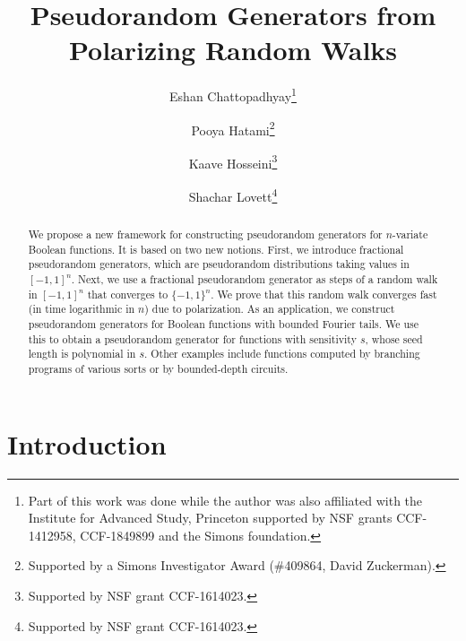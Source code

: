 \documentclass{toc}
\begin{document}
\begin{frontmatter}[classification=text]
  
%
%

%
%

  \title{Pseudorandom Generators from\\ Polarizing Random Walks}  %

%
%
%
%
%
%
%
%
%
%
%
%


%
%
%
%

%


\author[chattopadhyay]{Eshan Chattopadhyay\thanks{ Part of this work was done while the author was also affiliated with the Institute for Advanced Study, Princeton supported by NSF grants CCF-1412958, CCF-1849899  and the Simons foundation.}}
\author[hatami]{Pooya Hatami\thanks{Supported by a Simons Investigator Award (\#409864, David Zuckerman).}}
\author[hosseini]{Kaave Hosseini\thanks{Supported by NSF grant CCF-1614023.}}
\author[lovett]{Shachar Lovett\thanks{Supported by NSF grant CCF-1614023.}}
%
%
%
%

%
%
%
%
%
%
\begin{abstract}
  We propose a new framework for constructing pseudorandom generators for $n$-variate Boolean functions. It is based on two new notions.
First, we introduce fractional pseudorandom generators, which are pseudorandom distributions taking values in $[-1,1]^n$. Next, we use a fractional pseudorandom generator as steps of a random walk in $[-1,1]^n$ that converges to $\{-1,1\}^n$. We prove that this random walk converges fast (in time logarithmic in $n$)
due to polarization. As an application, we construct pseudorandom generators for Boolean functions with bounded Fourier tails. We use this to obtain a pseudorandom generator for functions with sensitivity $s$, whose seed length is polynomial in $s$. Other examples
include functions computed by branching programs of various sorts or by
%
bounded-depth   %
circuits.
\end{abstract}

%

\end{frontmatter}

\section{Introduction}
\end{document}
